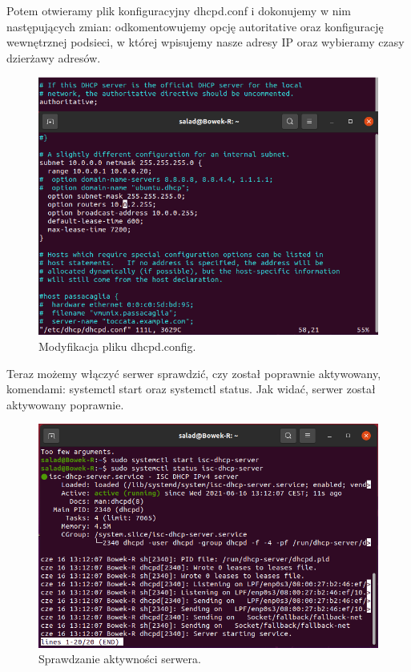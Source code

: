 \documentclass{article}
\begin{document}
Potem otwieramy plik konfiguracyjny dhcpd.conf i dokonujemy w nim następujących zmian: odkomentowujemy opcję autoritative oraz konfigurację wewnętrznej podsieci, w której wpisujemy nasze adresy IP oraz wybieramy czasy dzierżawy adresów.

\begin{figure}[H]
    \centering
    \includegraphics[scale = 0.68]{dhcp/dhcp4.png}  
    \caption{Modyfikacja pliku dhcpd.config.}
    \label{2}
\end{figure}

Teraz możemy włączyć serwer sprawdzić, czy został poprawnie aktywowany, komendami: systemctl start oraz systemctl status. Jak widać, serwer został aktywowany poprawnie. 

\begin{figure}[H]
    \centering
    \includegraphics[scale = 0.68]{dhcp/dhcp5_dziala.png}  
    \caption{Sprawdzanie aktywności serwera.}
    \label{2}
\end{figure}
\end{document}
